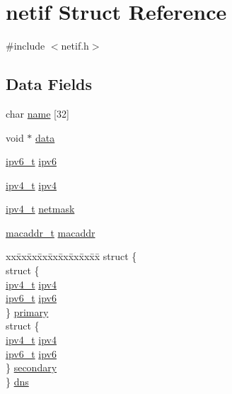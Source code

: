 \hypertarget{structnetif}{\section{netif Struct Reference}
\label{structnetif}
}


{\ttfamily \#include $<$netif.\+h$>$}

\subsection*{Data Fields}
\begin{DoxyCompactItemize}
\item 
char \hyperlink{structnetif_ad113ca0a458623939eec5ce7fe2b6eef}{name} \mbox{[}32\mbox{]}
\item 
void $\ast$ \hyperlink{structnetif_af45fb467da3492eb4473cb9208044ac8}{data}
\item 
\hyperlink{netif_8h_a0a195da7affbedb767969c3a02c9a82d}{ipv6\+\_\+t} \hyperlink{structnetif_aced1ed63f6f33dd3987a06deee6a2292}{ipv6}
\item 
\hyperlink{netif_8h_aea29db0d4ae23303ff7591af75c7b74a}{ipv4\+\_\+t} \hyperlink{structnetif_a312a8e870ce8803f02f5b09012ce6bc6}{ipv4}
\item 
\hyperlink{netif_8h_aea29db0d4ae23303ff7591af75c7b74a}{ipv4\+\_\+t} \hyperlink{structnetif_a36ef3cfb5f0403df355dc6db0ddc2426}{netmask}
\item 
\hyperlink{netif_8h_a95d524a06a1ff12a314f88bac04db658}{macaddr\+\_\+t} \hyperlink{structnetif_a7a5c433a646e2b4424fe8ebf12db535c}{macaddr}
\item 
\begin{tabbing}
xx\=xx\=xx\=xx\=xx\=xx\=xx\=xx\=xx\=\kill
struct \{\\
\>struct \{\\
\>\>\hyperlink{netif_8h_aea29db0d4ae23303ff7591af75c7b74a}{ipv4\_t} \hyperlink{structnetif_a312a8e870ce8803f02f5b09012ce6bc6}{ipv4}\\
\>\>\hyperlink{netif_8h_a0a195da7affbedb767969c3a02c9a82d}{ipv6\_t} \hyperlink{structnetif_aced1ed63f6f33dd3987a06deee6a2292}{ipv6}\\
\>\} \hyperlink{structnetif_a367e7d85725497d7703bfc0424f472cf}{primary}\\
\>struct \{\\
\>\>\hyperlink{netif_8h_aea29db0d4ae23303ff7591af75c7b74a}{ipv4\_t} \hyperlink{structnetif_a312a8e870ce8803f02f5b09012ce6bc6}{ipv4}\\
\>\>\hyperlink{netif_8h_a0a195da7affbedb767969c3a02c9a82d}{ipv6\_t} \hyperlink{structnetif_aced1ed63f6f33dd3987a06deee6a2292}{ipv6}\\
\>\} \hyperlink{structnetif_a793ad0cb27997bfa7874a2097a77b0e2}{secondary}\\
\} \hyperlink{structnetif_a30f1247e8e2ef8ac954833c81873608e}{dns}\\


\end{tabbing}
\end{DoxyCompactItemize}

